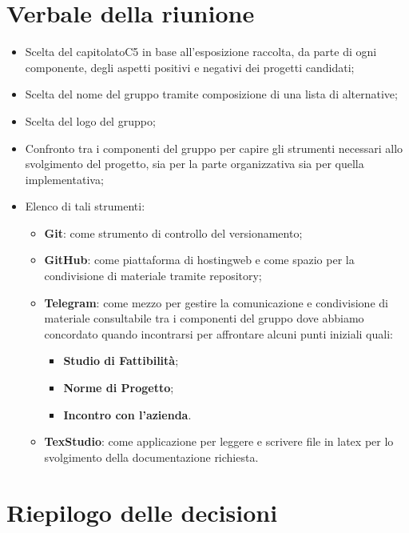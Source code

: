 \section{Verbale della riunione}
\begin{itemize}
	\item Scelta del capitolato\glosp C5 in base all'esposizione raccolta, da parte di ogni componente, 
		  degli aspetti positivi e negativi dei progetti candidati;
	\item Scelta del nome del gruppo tramite composizione di una lista di alternative;
	\item Scelta del logo del gruppo;
	\item Confronto tra i componenti del gruppo per capire gli strumenti necessari allo svolgimento del progetto, 
		  sia per la parte organizzativa sia per quella implementativa;
	\item Elenco di tali strumenti:
		\begin{itemize}
			\item \textbf{Git}: come strumento di controllo del versionamento;
			\item \textbf{GitHub}\glo: come piattaforma di hosting\glosp web e come spazio per la condivisione di materiale tramite repository\glo;
			\item \textbf{Telegram}\glo: come mezzo per gestire la comunicazione e condivisione di materiale consultabile tra i componenti
			del gruppo dove abbiamo concordato quando incontrarsi per affrontare alcuni punti iniziali quali:
			\begin{itemize}
				\item \textbf{Studio di Fattibilità};
				\item \textbf{Norme di Progetto};
				\item \textbf{Incontro con l'azienda}.
			\end{itemize}
			\item \textbf{TexStudio}: come applicazione per leggere e scrivere file in latex per lo svolgimento della documentazione richiesta.
		\end{itemize} 
\end{itemize} 
\pagebreak
\section{Riepilogo delle decisioni}

	
